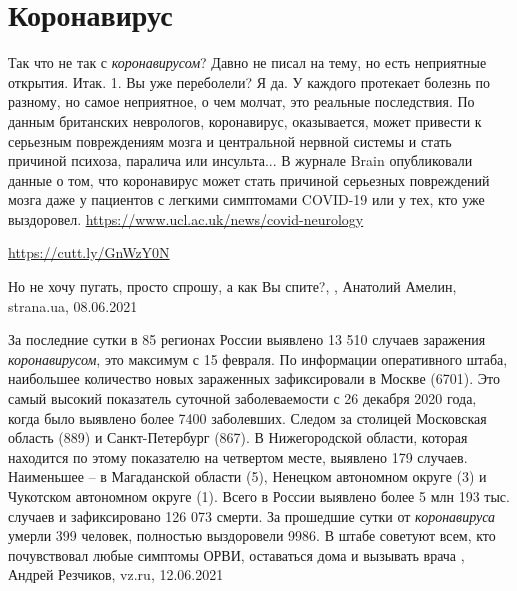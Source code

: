  
 
 
 
 
\chapter{Коронавирус}

Так что не так с \emph{коронавирусом}?  Давно не писал на тему, но есть
неприятные открытия. Итак. 1. Вы уже переболели? Я да.  У каждого протекает
болезнь по разному, но самое неприятное, о чем молчат, это реальные
последствия.  По данным британских неврологов, коронавирус, оказывается, может
привести к серьезным повреждениям мозга и центральной нервной системы и стать
причиной психоза, паралича или инсульта...  В журнале Brain опубликовали данные
о том, что коронавирус может стать причиной серьезных повреждений мозга даже у
пациентов с легкими симптомами COVID-19 или у тех, кто уже выздоровел.
\url{https://www.ucl.ac.uk/news/covid-neurology}\par
\url{https://cutt.ly/GnWzY0N}\par Но не хочу пугать, просто спрошу, а как Вы
спите?,
, Анатолий Амелин, strana.ua, 08.06.2021

За последние сутки в 85 регионах России выявлено 13 510 случаев заражения
\emph{коронавирусом}, это максимум с 15 февраля. По информации оперативного штаба,
наибольшее количество новых зараженных зафиксировали в Москве (6701). Это самый
высокий показатель суточной заболеваемости с 26 декабря 2020 года, когда было
выявлено более 7400 заболевших. Следом за столицей Московская область (889) и
Санкт-Петербург (867). В Нижегородской области, которая находится по этому
показателю на четвертом месте, выявлено 179 случаев. Наименьшее – в Магаданской
области (5), Ненецком автономном округе (3) и Чукотском автономном округе (1).
Всего в России выявлено более 5 млн 193 тыс. случаев и зафиксировано 126 073
смерти. За прошедшие сутки от \emph{коронавируса} умерли 399 человек, полностью
выздоровели 9986. В штабе советуют всем, кто почувствовал любые симптомы ОРВИ,
оставаться дома и вызывать врача
, Андрей Резчиков, vz.ru, 12.06.2021

